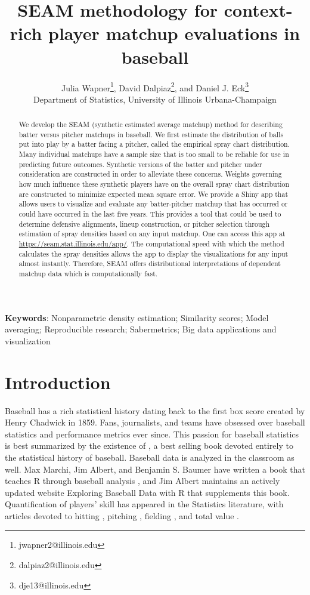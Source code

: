 \documentclass[12pt]{article}
\title{SEAM methodology for context-rich player matchup evaluations in baseball}
\author{Julia Wapner\thanks{jwapner2@illinois.edu},
David Dalpiaz\thanks{dalpiaz2@illinois.edu},
and Daniel J. Eck\thanks{dje13@illinois.edu} \\[1em]
Department of Statistics, University of Illinois Urbana-Champaign
}
\date{}
\begin{document}
\maketitle

\begin{abstract}
We develop the SEAM (synthetic estimated average matchup) method for describing batter versus pitcher matchups in baseball. We first estimate the distribution of balls put into play by a batter facing a pitcher, called the empirical spray chart distribution. Many individual matchups have a sample size that is too small to be reliable for use in predicting future outcomes. Synthetic versions of the batter and pitcher under consideration are constructed in order to alleviate these concerns. Weights governing how much influence these synthetic players have on the overall spray chart distribution are constructed to minimize expected mean square error. We provide a Shiny app that allows users to visualize and evaluate any batter-pitcher matchup that has occurred or could have occurred in the last five years. This provides a tool that could be used to determine defensive alignments, lineup construction, or pitcher selection through estimation of spray densities based on any input matchup. One can access this app at \url{https://seam.stat.illinois.edu/app/}. The computational speed with which the method calculates the spray densities allows the app to display the visualizations for any input almost instantly. Therefore, SEAM offers distributional interpretations of dependent matchup data which is computationally fast.
\end{abstract}

\noindent\textbf{Keywords}: Nonparametric density estimation; Similarity scores; Model averaging; Reproducible research; Sabermetrics; Big data applications and visualization


\section{Introduction}

Baseball has a rich statistical history dating back to the first box score created by Henry Chadwick in 1859. Fans, journalists, and teams have obsessed over baseball statistics and performance metrics ever since. This passion for baseball statistics is best summarized by the existence of \cite{schwarz2004numbers}, a best selling book devoted entirely to the statistical history of baseball. Baseball data is analyzed in the classroom as well. Max Marchi, Jim Albert, and Benjamin S. Baumer have written a book that teaches R through baseball analysis \citep{marchi2019analyzing}, and Jim Albert maintains an actively updated website Exploring Baseball Data with R that supplements this book.
Quantification of players' skill has appeared in the Statistics literature, with articles devoted to
hitting \citep{berry1999bridging, albert2008streaky, brown2008season, jensen2009hierarchical},
pitching \citep{albert2006pitching, shinya2017pitching},
fielding \citep{jensen2009bayesball, piette2012estimating},
and total value \citep{baumer2015openwar}.
\end{document}
